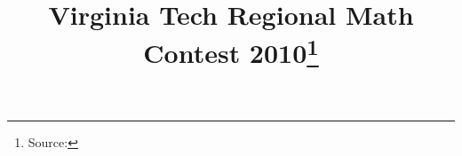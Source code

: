 \documentclass[10pt]{article}
\begin{document}
\title{Virginia Tech Regional Math Contest 2010\footnote{Source: \source}}
\author{\vspace{-2ex}}
\date{\vspace{-6ex}} %
\maketitle







\end{document}
